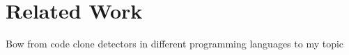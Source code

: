\section{Related Work}
\label{sec:related_work}

Bow from code clone detectors in different programming languages to my topic
